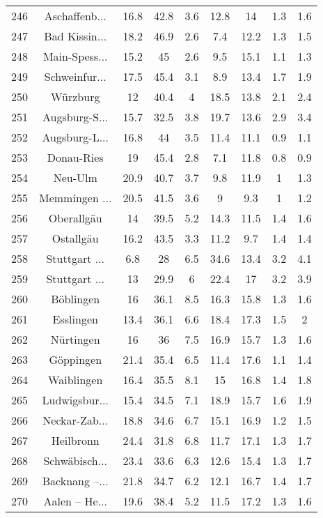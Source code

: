 \begin{table}[!htbp]
\begin{tabular}{@{\extracolsep{5pt}} ccccccccc}
246 & Aschaffenb... & 16.8 & 42.8 & 3.6 & 12.8 & 14 & 1.3 & 1.6 \\ 
247 & Bad Kissin... & 18.2 & 46.9 & 2.6 & 7.4 & 12.2 & 1.3 & 1.5 \\ 
248 & Main-Spess... & 15.2 & 45 & 2.6 & 9.5 & 15.1 & 1.1 & 1.3 \\ 
249 & Schweinfur... & 17.5 & 45.4 & 3.1 & 8.9 & 13.4 & 1.7 & 1.9 \\ 
250 & Würzburg & 12 & 40.4 & 4 & 18.5 & 13.8 & 2.1 & 2.4 \\ 
251 & Augsburg-S... & 15.7 & 32.5 & 3.8 & 19.7 & 13.6 & 2.9 & 3.4 \\ 
252 & Augsburg-L... & 16.8 & 44 & 3.5 & 11.4 & 11.1 & 0.9 & 1.1 \\ 
253 & Donau-Ries & 19 & 45.4 & 2.8 & 7.1 & 11.8 & 0.8 & 0.9 \\ 
254 & Neu-Ulm & 20.9 & 40.7 & 3.7 & 9.8 & 11.9 & 1 & 1.3 \\ 
255 & Memmingen ... & 20.5 & 41.5 & 3.6 & 9 & 9.3 & 1 & 1.2 \\ 
256 & Oberallgäu & 14 & 39.5 & 5.2 & 14.3 & 11.5 & 1.4 & 1.6 \\ 
257 & Ostallgäu & 16.2 & 43.5 & 3.3 & 11.2 & 9.7 & 1.4 & 1.4 \\ 
258 & Stuttgart ... & 6.8 & 28 & 6.5 & 34.6 & 13.4 & 3.2 & 4.1 \\ 
259 & Stuttgart ... & 13 & 29.9 & 6 & 22.4 & 17 & 3.2 & 3.9 \\ 
260 & Böblingen & 16 & 36.1 & 8.5 & 16.3 & 15.8 & 1.3 & 1.6 \\ 
261 & Esslingen & 13.4 & 36.1 & 6.6 & 18.4 & 17.3 & 1.5 & 2 \\ 
262 & Nürtingen & 16 & 36 & 7.5 & 16.9 & 15.7 & 1.3 & 1.6 \\ 
263 & Göppingen & 21.4 & 35.4 & 6.5 & 11.4 & 17.6 & 1.1 & 1.4 \\ 
264 & Waiblingen & 16.4 & 35.5 & 8.1 & 15 & 16.8 & 1.4 & 1.8 \\ 
265 & Ludwigsbur... & 15.4 & 34.5 & 7.1 & 18.9 & 15.7 & 1.6 & 1.9 \\ 
266 & Neckar-Zab... & 18.8 & 34.6 & 6.7 & 15.1 & 16.9 & 1.2 & 1.5 \\ 
267 & Heilbronn & 24.4 & 31.8 & 6.8 & 11.7 & 17.1 & 1.3 & 1.7 \\ 
268 & Schwäbisch... & 23.4 & 33.6 & 6.3 & 12.6 & 15.4 & 1.3 & 1.7 \\ 
269 & Backnang –... & 21.8 & 34.7 & 6.2 & 12.1 & 16.7 & 1.4 & 1.7 \\ 
270 & Aalen – He... & 19.6 & 38.4 & 5.2 & 11.5 & 17.2 & 1.3 & 1.6 \\ 

\end{tabular}
\end{table}
